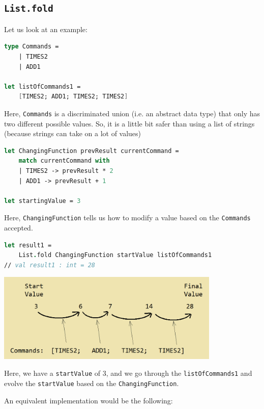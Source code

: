 \documentclass[12pt]{article}
\begin{document}
\subsection{\texttt{List.fold}}
Let us look at an example:
\begin{lstlisting}[language=FSharp]
type Commands =
    | TIMES2
    | ADD1

let listOfCommands1 =
    [TIMES2; ADD1; TIMES2; TIMES2]
\end{lstlisting}
Here, \texttt{Commands} is a discriminated union (i.e. an abstract data type) that only has two different possible values. So, it is a little bit safer than using a list of strings (because strings can take on a lot of values)

\begin{lstlisting}[language=FSharp]
let ChangingFunction prevResult currentCommand =
    match currentCommand with
    | TIMES2 -> prevResult * 2
    | ADD1 -> prevResult + 1

let startingValue = 3
\end{lstlisting}
Here, \texttt{ChangingFunction} tells us how to modify a value based on the \texttt{Commands} accepted.

\begin{lstlisting}[language=FSharp]
let result1 =
    List.fold ChangingFunction startValue listOfCommands1
// val result1 : int = 28
\end{lstlisting}

\begin{center}
\includegraphics[width=0.8\textwidth]{pictures/picture31.png}
\end{center}
Here, we have a \texttt{startValue} of $3$, and we go through the \texttt{listOfCommands1} and evolve the \texttt{startValue} based on the \texttt{ChangingFunction}.

An equivalent implementation would be the following:
\end{document}
